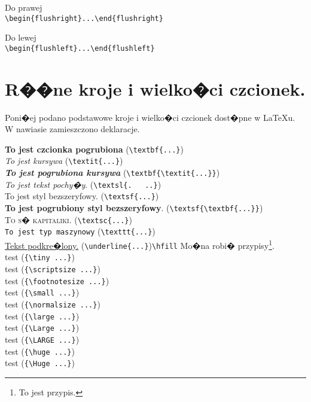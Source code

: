 \documentclass[11pt,wide]{mwart}
\begin{document}
\begin{flushright}
Do prawej\\
\verb"\begin{flushright}...\end{flushright}"
\end{flushright}

\begin{flushleft}
Do lewej\\
\verb"\begin{flushleft}...\end{flushleft}"
\end{flushleft}


\section{R��ne kroje i wielko�ci czcionek.}

Poni�ej podano podstawowe kroje i wielko�ci czcionek dost�pne w \LaTeX u.
W nawiasie zamieszczono deklaracje.

%
%
%
%

\noindent
\textbf{To jest czcionka pogrubiona} (\verb+\textbf{...}+)\\
\textit{To jest kursywa} (\verb+\textit{...}+)\\
\textbf{\textit{To jest pogrubiona kursywa}} (\verb+\textbf{\textit{...}}+)\\
\textsl{To jest tekst pochy�y}. (\verb+\textsl{.   ..}+)\\
\textsf{To jest styl bezszeryfowy}. (\verb+\textsf{...}+)\\
\textsf{\textbf{To jest pogrubiony styl bezszeryfowy}}.
(\verb+\textsf{\textbf{...}}+)\\
\textsc{To s� kapitaliki}. (\verb+\textsc{...}+)\\
\texttt{To jest typ maszynowy} (\verb+\texttt{...}+)\\
\underline{Tekst podkre�lony.} (\verb+\underline{...}+)\hfill\verb+\hfill+\hfill
Mo�na robi� przypisy\footnote{To jest przypis.}.\\[3ex] %
{\tiny test} (\verb+{\tiny ...}+)\\                     %
{\scriptsize test} (\verb+{\scriptsize ...}+)\\         %
{\footnotesize test} (\verb+{\footnotesize ...}+)\\     %
{\small test} (\verb+{\small ...}+)\\                   %
{\normalsize test} (\verb+{\normalsize ...}+)\\
{\large test} (\verb+{\large ...}+)\\
{\Large test} (\verb+{\Large ...}+)\\
{\LARGE test} (\verb+{\LARGE ...}+)\\
{\huge test} (\verb+{\huge ...}+)\\
{\Huge test} (\verb+{\Huge ...}+)
\end{document}
